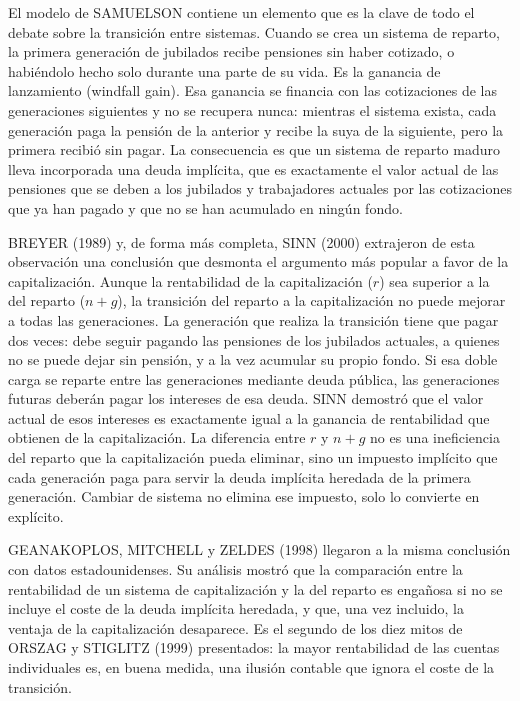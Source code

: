 \documentclass[10pt,a4paper]{article}
\begin{document}
El modelo de SAMUELSON contiene un elemento que es la clave de todo el debate sobre la transición entre sistemas. Cuando se crea un sistema de reparto, la primera generación de jubilados recibe pensiones sin haber cotizado, o habiéndolo hecho solo durante una parte de su vida. Es la ganancia de lanzamiento (windfall gain). Esa ganancia se financia con las cotizaciones de las generaciones siguientes y no se recupera nunca: mientras el sistema exista, cada generación paga la pensión de la anterior y recibe la suya de la siguiente, pero la primera recibió sin pagar. La consecuencia es que un sistema de reparto maduro lleva incorporada una deuda implícita, que es exactamente el valor actual de las pensiones que se deben a los jubilados y trabajadores actuales por las cotizaciones que ya han pagado y que no se han acumulado en ningún fondo.

BREYER (1989) y, de forma más completa, SINN (2000) extrajeron de esta observación una conclusión que desmonta el argumento más popular a favor de la capitalización. Aunque la rentabilidad de la capitalización ($r$) sea superior a la del reparto ($n + g$), la transición del reparto a la capitalización no puede mejorar a todas las generaciones. La generación que realiza la transición tiene que pagar dos veces: debe seguir pagando las pensiones de los jubilados actuales, a quienes no se puede dejar sin pensión, y a la vez acumular su propio fondo. Si esa doble carga se reparte entre las generaciones mediante deuda pública, las generaciones futuras deberán pagar los intereses de esa deuda. SINN demostró que el valor actual de esos intereses es exactamente igual a la ganancia de rentabilidad que obtienen de la capitalización. La diferencia entre $r$ y $n + g$ no es una ineficiencia del reparto que la capitalización pueda eliminar, sino un impuesto implícito que cada generación paga para servir la deuda implícita heredada de la primera generación. Cambiar de sistema no elimina ese impuesto, solo lo convierte en explícito.

GEANAKOPLOS, MITCHELL y ZELDES (1998) llegaron a la misma conclusión con datos estadounidenses. Su análisis mostró que la comparación entre la rentabilidad de un sistema de capitalización y la del reparto es engañosa si no se incluye el coste de la deuda implícita heredada, y que, una vez incluido, la ventaja de la capitalización desaparece. Es el segundo de los diez mitos de ORSZAG y STIGLITZ (1999) presentados: la mayor rentabilidad de las cuentas individuales es, en buena medida, una ilusión contable que ignora el coste de la transición.
\end{document}
